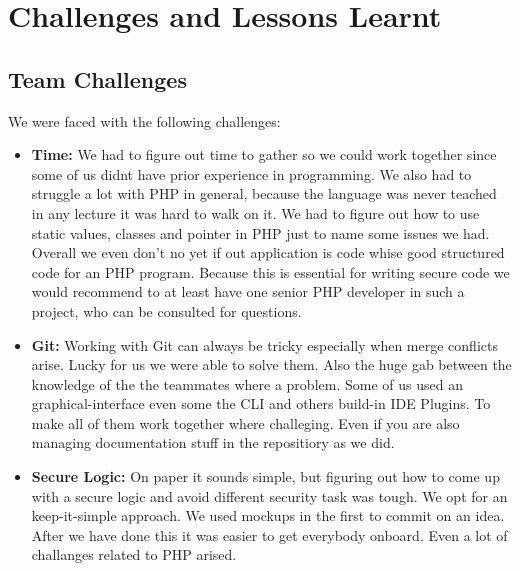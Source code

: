 \documentclass[12pt,a4paper]{article}
\begin{document}
\begin{flushleft}
	\end{flushleft}
	
	
	
	
	\section{Challenges and Lessons Learnt}
	\subsection{Team Challenges}
	\begin{flushleft}
	
		We were faced with the following challenges:
		\begin{itemize}
			\item \textbf{Time:} We had to figure out time to gather so we could work together since some of us didnt have prior
			experience in programming. We also had to struggle a lot with PHP in general, because the language was never teached in any lecture it was hard to walk on it. We had to figure out how to use static values, classes and pointer in PHP just to name some issues we had. Overall we even don't no yet if out application is code whise good structured code for an PHP program. Because this is essential for writing secure code we would recommend to at least have one senior PHP developer in such a project, who can be consulted for questions.
			\item \textbf{Git:} Working with Git can always be tricky especially when merge conflicts arise. Lucky for us we were able to solve them. Also the huge gab between the knowledge of the the teammates where a problem. Some of us used an graphical-interface even some the CLI and others build-in IDE Plugins. To make all of them work together where challeging. Even if you are also managing documentation stuff in the repositiory as we did. 
			\item \textbf{Secure Logic:} On paper it sounds simple, but figuring out how to come up with a secure logic and avoid different security task was tough. We opt for an keep-it-simple approach. We used mockups in the first to commit on an idea. After we have done this it was easier to get everybody onboard. Even a lot of challanges related to PHP arised. 
		\end{itemize}
		
	\end{flushleft}
	
	
\end{document}
